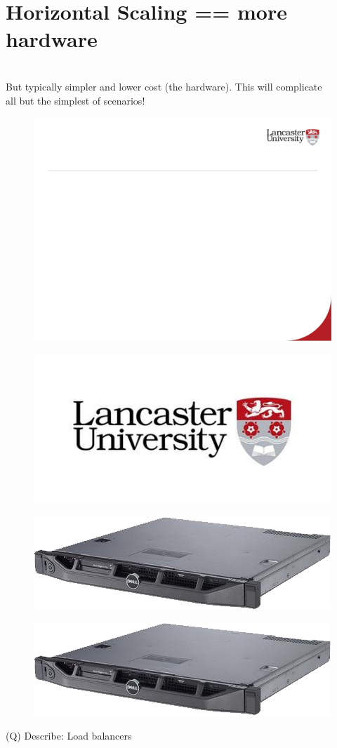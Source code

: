 \documentclass[12pt]{article}
\begin{document}
\section{Horizontal Scaling == more hardware}
\\
But typically simpler and lower cost (the hardware).  This will complicate \\
all but the simplest of scenarios!\\
\begin{figure}[H]
\includegraphics[width=0.5\linewidth]{page73-image-1.png}
\end{figure}
\begin{figure}[H]
\includegraphics[width=0.5\linewidth]{page73-image-2.png}
\end{figure}
\begin{figure}[H]
\includegraphics[width=0.5\linewidth]{page73-image-3.png}
\end{figure}
\begin{figure}[H]
\includegraphics[width=0.5\linewidth]{page73-image-4.png}
\end{figure}
\clearpage
(Q)
Describe: Load balancers
\clearpage
\end{document}

